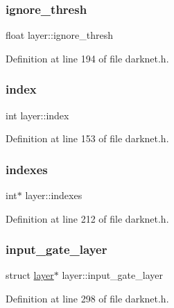 \mbox{\label{structlayer_ad1052957257631f1cba42a25ed63159b}} 
\subsubsection{\texorpdfstring{ignore\_thresh}{ignore\_thresh}}
{\footnotesize\ttfamily float layer\+::ignore\+\_\+thresh}



Definition at line 194 of file darknet.\+h.

\mbox{\label{structlayer_a98964b626e3a83be1235c3aed8178810}} 
\subsubsection{\texorpdfstring{index}{index}}
{\footnotesize\ttfamily int layer\+::index}



Definition at line 153 of file darknet.\+h.

\mbox{\label{structlayer_a545ce2f1db475b370db778c433913fde}} 
\subsubsection{\texorpdfstring{indexes}{indexes}}
{\footnotesize\ttfamily int$\ast$ layer\+::indexes}



Definition at line 212 of file darknet.\+h.

\mbox{\label{structlayer_ad7cd67a8989bbdafa89982d9c1f64c78}} 
\subsubsection{\texorpdfstring{input\_gate\_layer}{input\_gate\_layer}}
{\footnotesize\ttfamily struct \mbox{\hyperlink{structlayer}{layer}}$\ast$ layer\+::input\+\_\+gate\+\_\+layer}



Definition at line 298 of file darknet.\+h.

